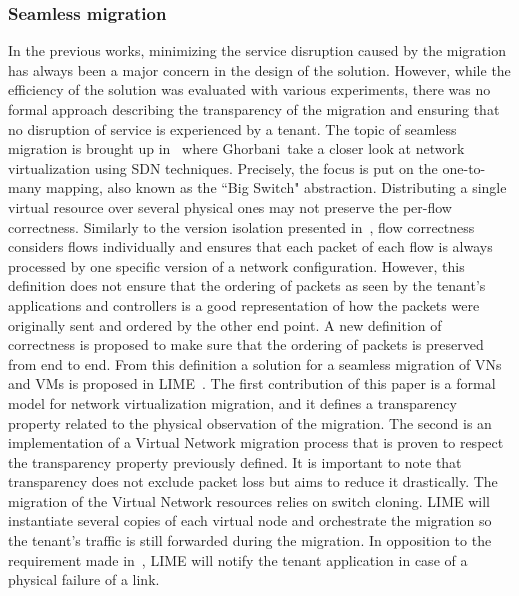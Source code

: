 \subsubsection{Seamless migration}
In the previous works, minimizing the service disruption caused by the migration has always been a major concern in the design of the solution. However, while the efficiency of the solution was evaluated with various experiments, there was no formal approach describing the transparency of the migration and ensuring that no disruption of service is experienced by a tenant.
The topic of seamless migration is brought up in~\cite{toward-Ghorbani2014} where Ghorbani~\etal take a closer look at network virtualization using SDN techniques.
Precisely, the focus is put on the one-to-many mapping, also known as the ``Big Switch" abstraction.
Distributing a single virtual resource over several physical ones may not preserve the per-flow correctness.
Similarly to the version isolation presented in~\cite{Liu2015a}, flow correctness considers flows individually and ensures that each packet of each flow is always processed by one specific version of a network configuration. 
However, this definition does not ensure that the ordering of packets as seen by the tenant's applications and controllers is a good representation of how the packets were originally sent and ordered by the other end point.
A new definition of correctness is proposed to make sure that the ordering of packets is preserved from end to end.
From this definition  a solution for a seamless migration of VNs and VMs is proposed in LIME~\cite{Lime-Ghorbani2014}.
The first contribution of this paper is a formal model for network virtualization migration, and it defines a transparency property related to the physical observation of the migration.
The second is an implementation of a Virtual Network migration process that is proven to respect the transparency property previously defined.
It is important to note that transparency does not exclude packet loss but aims to reduce it drastically.
The migration of the Virtual Network resources relies on switch cloning.
LIME will instantiate several copies of each virtual node and orchestrate the migration so the tenant's traffic is still forwarded during the migration.
In opposition to the requirement made in~\cite{Ko2017c}, LIME will notify the tenant application in case of a physical failure of a link.
